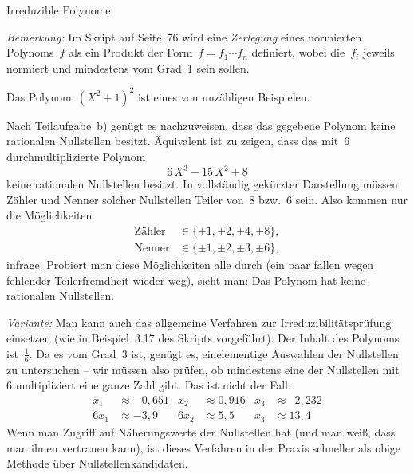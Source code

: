\documentclass{algblatt}
\begin{document}
\begin{aufgabe}{Irreduzible Polynome}
\begin{loesungE}
\emph{Bemerkung:} Im Skript auf Seite~76 wird eine \emph{Zerlegung} eines
normierten Polynoms~$f$ als ein Produkt der Form~$f = f_1 \cdots f_n$
definiert, wobei die~$f_i$ jeweils normiert und mindestens vom Grad~1 sein
sollen.

\item Das Polynom~$(X^2+1)^2$ ist eines von unzähligen Beispielen.

\item Nach Teilaufgabe~b) genügt es nachzuweisen, dass das gegebene Polynom
keine rationalen Nullstellen besitzt. Äquivalent ist zu zeigen, dass das
mit~$6$ durchmultiplizierte Polynom
\[ 6 \, X^3 - 15 \, X^2 + 8 \]
keine rationalen Nullstellen besitzt. In vollständig gekürzter Darstellung
müssen Zähler und Nenner solcher Nullstellen Teiler von~$8$ bzw.~$6$ sein.
Also kommen nur die Möglichkeiten
\begin{align*}
  \text{Zähler} &\in \{ \pm 1, \pm 2, \pm 4, \pm 8 \}, \\
  \text{Nenner} &\in \{ \pm 1, \pm 2, \pm 3, \pm 6 \},
\end{align*}
infrage. Probiert man diese Möglichkeiten alle durch (ein paar fallen
wegen fehlender Teilerfremdheit wieder weg), sieht man: Das Polynom hat keine
rationalen Nullstellen.

\emph{Variante:} Man kann auch das allgemeine Verfahren zur
Irreduzibilitätsprüfung einsetzen (wie in Beispiel~3.17 des Skripts
vorgeführt). Der Inhalt des Polynoms ist~$\frac{1}{6}$. Da es vom Grad~3 ist,
genügt es, einelementige Auswahlen der Nullstellen zu untersuchen -- wir müssen
also prüfen, ob mindestens eine der Nullstellen mit~$6$ multipliziert eine
ganze Zahl gibt. Das ist nicht der Fall:
\begin{align*}
  x_1 &\approx -0{,}651 & x_2 &\approx 0{,}916 & x_3 &\approx \phantom{0}2{,}232 \\
  6 x_1 &\approx -3{,}9 & 6 x_2 &\approx 5{,}5 & x_3 &\approx 13{,}4
\end{align*}
Wenn man Zugriff auf Näherungswerte der Nullstellen hat (und man weiß, dass man
ihnen vertrauen kann), ist dieses Verfahren in der Praxis schneller als obige
Methode über Nullstellenkandidaten.
\end{loesungE}
\end{aufgabe}
\end{document}
